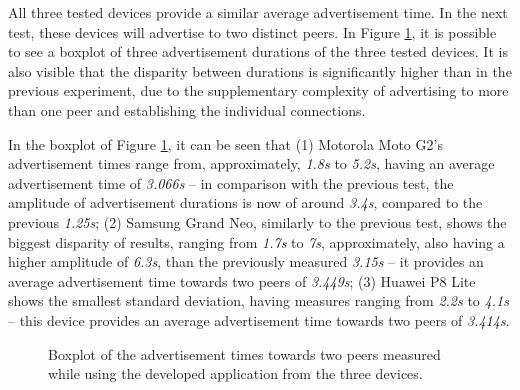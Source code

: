 All three tested devices provide a similar average advertisement time. In the next test, these devices will advertise to two distinct peers. In Figure \ref{fig:adv2}, it is possible to see a boxplot of three advertisement durations of the three tested devices. It is also visible that the disparity between durations is significantly higher than in the previous experiment, due to the supplementary complexity of advertising to more than one peer and establishing the individual connections.

In the boxplot of Figure \ref{fig:adv2}, it can be seen that (1) Motorola Moto G2's advertisement times range from, approximately, \textit{1.8s} to \textit{5.2s}, having an average advertisement time of \textit{3.066s} -- in comparison with the previous test, the amplitude of advertisement durations is now of around \textit{3.4s}, compared to the previous \textit{1.25s}; (2) Samsung Grand Neo, similarly to the previous test, shows the biggest disparity of results, ranging from \textit{1.7s} to \textit{7s}, approximately, also having a higher amplitude of \textit{6.3s}, than the previously measured \textit{3.15s} -- it provides an average advertisement time towards two peers of \textit{3.449s}; (3) Huawei P8 Lite shows the smallest standard deviation, having measures ranging from \textit{2.2s} to \textit{4.1s} -- this device provides an average advertisement time towards two peers of \textit{3.414s}.

\begin{figure}[ht]
	\noindent{}
	\caption{\label{fig:adv2} Boxplot of the advertisement times towards two peers measured while using the developed application from the three devices.}
\end{figure}

